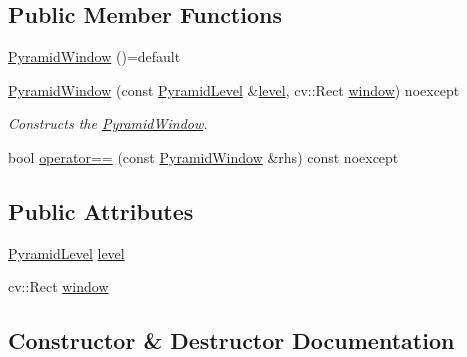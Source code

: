\subsection*{Public Member Functions}
\begin{DoxyCompactItemize}
\item 
\hyperlink{structdg_1_1deepcore_1_1imagery_1_1_pyramid_window_a48de48c808a43eeac92353441cddaba4}{Pyramid\+Window} ()=default
\item 
\hyperlink{group___imagery_module_ga96c7cf53df8e5ca33d62bc9ec25215b5}{Pyramid\+Window} (const \hyperlink{structdg_1_1deepcore_1_1imagery_1_1_pyramid_level}{Pyramid\+Level} \&\hyperlink{structdg_1_1deepcore_1_1imagery_1_1_pyramid_window_aa08adb03843e4cd955b767c82d54e335}{level}, cv\+::\+Rect \hyperlink{structdg_1_1deepcore_1_1imagery_1_1_pyramid_window_aa7e015320172969330a744d0da0c5ad3}{window}) noexcept
\begin{DoxyCompactList}\small\item\em Constructs the \hyperlink{structdg_1_1deepcore_1_1imagery_1_1_pyramid_window}{Pyramid\+Window}. \end{DoxyCompactList}\item 
bool \hyperlink{structdg_1_1deepcore_1_1imagery_1_1_pyramid_window_adc779a66c293a26526d342227433c10e}{operator==} (const \hyperlink{structdg_1_1deepcore_1_1imagery_1_1_pyramid_window}{Pyramid\+Window} \&rhs) const noexcept
\end{DoxyCompactItemize}
\subsection*{Public Attributes}
\begin{DoxyCompactItemize}
\item 
\hyperlink{structdg_1_1deepcore_1_1imagery_1_1_pyramid_level}{Pyramid\+Level} \hyperlink{structdg_1_1deepcore_1_1imagery_1_1_pyramid_window_aa08adb03843e4cd955b767c82d54e335}{level}
\item 
cv\+::\+Rect \hyperlink{structdg_1_1deepcore_1_1imagery_1_1_pyramid_window_aa7e015320172969330a744d0da0c5ad3}{window}
\end{DoxyCompactItemize}


\subsection{Constructor \& Destructor Documentation}
